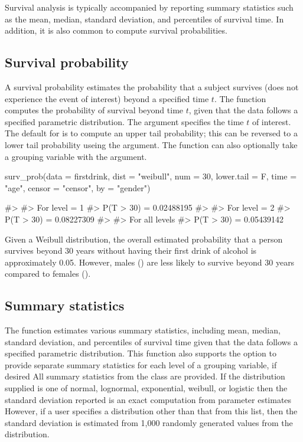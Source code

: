 Survival analysis is typically accompanied by reporting summary
statistics such as the mean, median, standard deviation, and percentiles
of survival time. In addition, it is also common to compute survival
probabilities.

\hypertarget{survival-probability}{%
\subsection{Survival probability}\label{survival-probability}}

A survival probability estimates the probability that a subject survives
(does not experience the event of interest) beyond a specified time
\(t\). The function  computes the probability of
survival beyond time \(t\), given that the data follows a specified
parametric distribution. The  argument specifies the time
\(t\) of interest. The default for  is to compute an
upper tail probability; this can be reversed to a lower tail probability
useing the  argument. The function can also optionally
take a grouping variable with the  argument.

\begin{Schunk}
\begin{Sinput}
surv_prob(data = firstdrink, dist = "weibull", num = 30, lower.tail = F, time = "age", censor = "censor", by = "gender")
\end{Sinput}
\begin{Soutput}
#> 
#> For level = 1 
#> P(T > 30) = 0.02488195
#> 
#> For level = 2 
#> P(T > 30) = 0.08227309
#> 
#> For all levels
#> P(T > 30) = 0.05439142
\end{Soutput}
\end{Schunk}

Given a Weibull distribution, the overall estimated probability that a
person survives beyond 30 years without having their first drink of
alcohol is approximately 0.05. However, males () are
less likely to survive beyond 30 years compared to females
().

\hypertarget{summary-statistics}{%
\subsection{Summary statistics}\label{summary-statistics}}

The  function estimates various summary statistics,
including mean, median, standard deviation, and percentiles of survival
time given that the data follows a specified parametric distribution.
This function also supports the option to provide separate summary
statistics for each level of a grouping variable, if desired All summary
statistics from the class  are provided. If the
distribution supplied is one of normal, lognormal, exponential, weibull,
or logistic then the standard deviation reported is an exact computation
from parameter estimates However, if a user specifies a distribution
other than that from this list, then the standard deviation is estimated
from 1,000 randomly generated values from the distribution.


